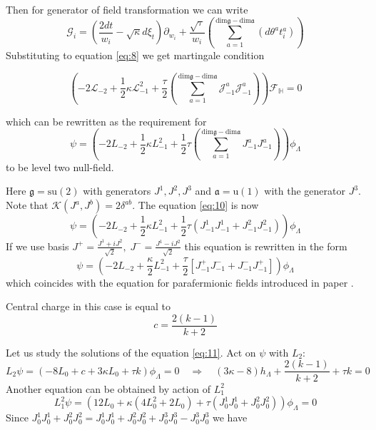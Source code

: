 \documentclass[a4paper]{jpconf}
\theoremstyle{definition}
\newcommand{\gf}{\mathfrak{g}}
\newcommand{\af}{\mathfrak{a}}
\theoremstyle{definition} \newtheorem{Def}{Definition}
\begin{document}
Then for generator of field transformation we can write 
\begin{equation}
  \mathcal{G}_{i}=\left(\frac{2dt}{w_{i}}-\sqrt{\kappa} d\xi_{t}\right) \partial_{w_{i}}+\frac{\sqrt{\tau}}{w_{i}}\left(\sum_{a=1}^{\mathrm{dim}\gf-\mathrm{dim}\af}\left(d \theta ^{a} t^{a}_{i}\right)\right)
\label{eq:5}
\end{equation}
Substituting to equation \eqref{eq:8} we get martingale condition

\begin{equation}
  \left(-2 \mathcal{L}_{-2}+\frac{1}{2}\kappa \mathcal{L}_{-1}^{2}+\frac{\tau}{2}\left( \sum_{a=1}^{\mathrm{dim}\gf-\mathrm{dim}\af} \mathcal{J}^{a}_{-1} \mathcal{J}^{a}_{-1}\right)\right)        \mathcal{F}_{\mathbb{H}}=0
\label{eq:9}
\end{equation}

which can be rewritten as the requirement for
\begin{equation}
  \psi=\left(-2L_{-2}+\frac{1}{2}\kappa L_{-1}^{2}+\frac{1}{2}\tau \left(\sum_{a=1}^{\mathrm{dim}\gf-\mathrm{dim}\af}J^{a}_{-1}J^{a}_{-1}\right)\right) \phi_{\Lambda}
\label{eq:10}
\end{equation}
to be level two null-field. 

Here $\gf=\mathrm{su}(2)$ with generators $J^{1},J^{2},J^{3}$ and $\af=\mathrm{u}(1)$ with the generator $J^{3}$. Note that $\mathcal{K}(J^{a},J^{b})=2\delta^{ab}$. The equation \eqref{eq:10} is now
\begin{equation}
  \label{eq:11}
  \psi=\left(-2L_{-2}+\frac{1}{2}\kappa L_{-1}^{2}+\frac{1}{2}\tau \left(J^{1}_{-1}J^{1}_{-1}+J^{2}_{-1}J^{2}_{-1}\right)\right) \phi_{\Lambda}
\end{equation}
If we use basis $J^{+}=\frac{J^{1}+iJ^{2}}{\sqrt{2}},\; J^{-}=\frac{J^{1}-iJ^{2}}{\sqrt{2}}$ this equation is rewritten in the form
\begin{equation}
 \psi= \left(-2 L_{-2}+\frac{\kappa}{2}L_{-1}^{2}+\frac{\tau}{2}\left[J^{+}_{-1}J^{-}_{-1}+J^{-}_{-1}J^{+}_{-1}\right]\right) \phi_{\Lambda}
\label{eq:12}
\end{equation}
which coincides with the equation for parafermionic fields introduced in paper \cite{santachiara2008sle}.

Central charge in this case is equal to
\begin{equation}
  \label{eq:14}
  c=\frac{2(k-1)}{k+2}
\end{equation}

Let us study the solutions of the equation \eqref{eq:11}. Act on $\psi$ with $L_{2}$:
\begin{equation}
  \label{eq:13}
  L_{2}\psi=(-8L_{0}+c+3\kappa L_{0}+\tau k)\phi_{\Lambda}=0\quad \Longrightarrow\quad  (3\kappa-8) h_{\Lambda}+\frac{2(k-1)}{k+2}+\tau k =0
\end{equation}
Another equation can be obtained by action of $L_{1}^{2}$
\begin{equation}
  \label{eq:15}
  L_{1}^{2}\psi = (12 L_{0} + \kappa(4 L_{0}^{2}+2 L_{0}) +\tau (J_{0}^{1}J_{0}^{1}+J_{0}^{2}J_{0}^{2}))\phi_{\Lambda}=0
\end{equation}
Since $J_{0}^{1}J_{0}^{1}+J_{0}^{2}J_{0}^{2}=J_{0}^{1}J_{0}^{1}+J_{0}^{2}J_{0}^{2}+J_{0}^{3}J_{0}^{3}-J_{0}^{3}J_{0}^{3}$ we have
\end{document}
